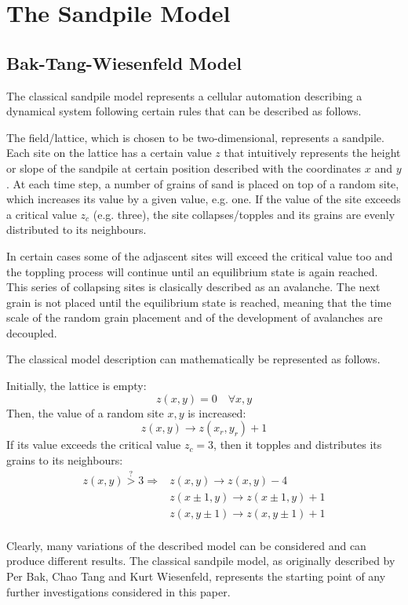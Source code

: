 \chapter{The Sandpile Model}
\thispagestyle{fancy}

\section{Bak-Tang-Wiesenfeld Model}

The classical sandpile model represents a cellular automation describing a dynamical system following certain rules that can be described as follows.

The field/lattice, which is chosen to be two-dimensional, represents a sandpile. Each site on the lattice has a certain value $z$ that intuitively represents the height or slope of the sandpile at certain position described with the coordinates $x$ and $y$. At each time step, a number of grains of sand is placed on top of a random site, which increases its value by a given value, e.g. one. If the value of the site exceeds a critical value $z_c$ (e.g. three), the site collapses/topples and its grains are evenly distributed to its neighbours.

In certain cases some of the adjascent sites will exceed the critical value too and the toppling process will continue until an equilibrium state is again reached. This series of collapsing sites is clasically described as an avalanche. The next grain is not placed until the equilibrium state is reached, meaning that the time scale of the random grain placement and of the development of avalanches are decoupled.

The classical model description can mathematically be represented as follows.

Initially, the lattice is empty:
\[
z(x,y) = 0 \quad\forall x, y
\]
Then, the value of a random site $x,y$ is increased:
\[
z(x,y) \to z(x_r,y_r) + 1
\]
If its value exceeds the critical value $z_c=3$, then it topples and distributes its grains to its neighbours:
\[
\begin{aligned}
z(x,y) \overset{?}{>} 3 \Rightarrow & z(x,y) \to z(x,y)-4 \\
 & z(x\pm 1,y) \to z(x\pm 1,y)+1 \\
 & z(x,y\pm 1) \to z(x,y\pm 1)+1 \\
\end{aligned}
\]

Clearly, many variations of the described model can be considered and can produce different results. The classical sandpile model, as originally described by Per Bak, Chao Tang and Kurt Wiesenfeld, represents the starting point of any further investigations considered in this paper.


